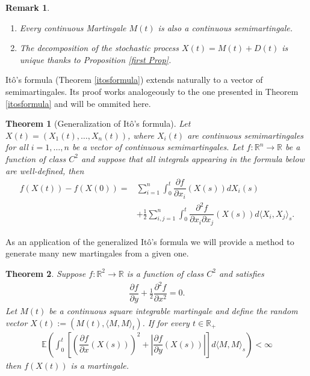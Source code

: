\documentclass[11pt,a4paper, final]{article}
\newtheorem{thm}{Theorem}[section]
\newtheorem{rem}{Remark}[defn]
\begin{document}
\begin{rem}  \ 
\begin{enumerate} 
\item Every continuous Martingale $M(t)$ is also a continuous semimartingale. 
\item The decomposition of the stochastic process $X(t)=M(t) + D(t)$ is unique thanks to Proposition \ref{first Prop}. 
\end{enumerate} 
\end{rem}
\noindent Itô's formula (Theorem \ref{itosformula}) extends naturally to a vector of semimartingales. Its proof works analogeously to the one presented in Theorem \ref{itosformula} and will be ommited here.
\begin{thm}[Generalization of Itô's formula] Let $X(t) = (X_1(t), \dots , X_n(t))$, where $X_i(t)$ are continuous semimartingales for all $i=1, \dots ,n$ be a vector of continuous semimartingales. Let $f: \mathbb{R}^n \to \mathbb{R}$ be a function of class $C^2$ and suppose that all integrals appearing in the formula below are well-defined, then 
\begin{align*}
f(X(t))-f(X(0)) = & \sum_{i=1}^n \int_0^t \dfrac{\partial f}{\partial x_i} (X(s)) dX_i(s)
\\ & + \frac{1}{2} \sum_{i,j=1}^n \int_0^t \dfrac{\partial^2 f	}{\partial x_i \partial x_j}(X(s))d \langle X_i, X_j \rangle_s. 
\end{align*}
\end{thm}
\noindent As an application of the generalized Itô's formula we will provide a method to generate many new martingales from a given one. 
\newpage
\begin{thm} \label{fromitotomartingale} Suppose $f: \mathbb{R}^2 \to \mathbb{R}$ is a function of class $C^2$ and satisfies \begin{align*}
\dfrac{\partial f}{\partial y} + \frac{1}{2} \dfrac{\partial^2 f}{\partial x^2}= 0. 
\end{align*}
Let $M(t)$ be a continuous square integrable martingale and define the random vector $X(t):=(M(t), \langle M, M \rangle_t )$. If for every $t \in \mathbb{R}_+$ 
\begin{align*}
\mathbb{E} \left( \int_0^t \left[ \left( \dfrac{\partial f}{\partial x}(X(s)) \right)^2 + \left| \dfrac{\partial f}{\partial y} (X(s)) \right| \right] d \langle M, M \rangle_s \right) < \infty \tag{$\diamondsuit$}
\end{align*}
then $f(X(t))$ is a martingale. 
\end{thm}
\end{document}
